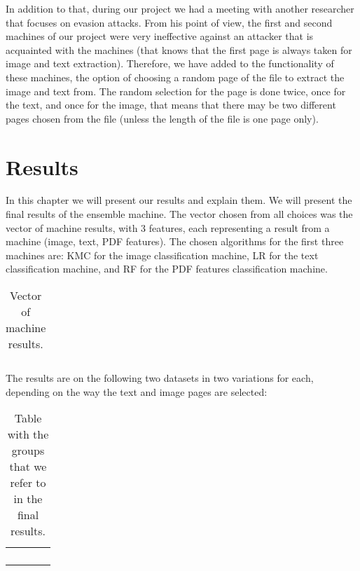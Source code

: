 \documentclass{article}
\begin{document}
\indent In addition to that, during our project we had a meeting with another researcher that focuses on evasion attacks. From his point of view, the first and second machines of our project were very ineffective against an attacker that is acquainted with the machines (that knows that the first page is always taken for image and text extraction). Therefore, we have added to the functionality of these machines, the option of choosing a random page of the file to extract the image and text from. The random selection for the page is done twice, once for the text, and once for the image, that means that there may be two different pages chosen from the file (unless the length of the file is one page only). 

\section{Results}
\indent In this chapter we will present our results and explain them. We will present the final results of the ensemble machine. The vector chosen from all choices was the vector of machine results, with 3 features, each representing a result from a machine (image, text, PDF features). The chosen algorithms for the first three machines are: KMC for the image classification machine, LR for the text classification machine, and RF for the PDF features classification machine.

\begin{table}[htb]
\centering
\begin{tabular}{|M{3.0cm}|M{3.0cm}|M{3.0cm}|}
	\hline
	 &  & \tabularnewline
	\hline
\end{tabular}
\caption{Vector of machine results.}
\end{table}

\indent The results are on the following two datasets in two variations for each, depending on the way the text and image pages are selected:

\begin{table}[htb]
\centering
\begin{tabular}{|M{2.5cm}|M{2.5cm}|M{2.5cm}|M{2.5cm}|}
	\hline
	 &  &  & \tabularnewline
	\hline
	 &  &  & \tabularnewline
	\hline
	 &  &  & \tabularnewline
	\hline
	 &  &  & \tabularnewline
	\hline
	 &  &  & \tabularnewline
	\hline
\end{tabular}
\caption{Table with the groups that we refer to in the final results.}
\end{table}
\end{document}
